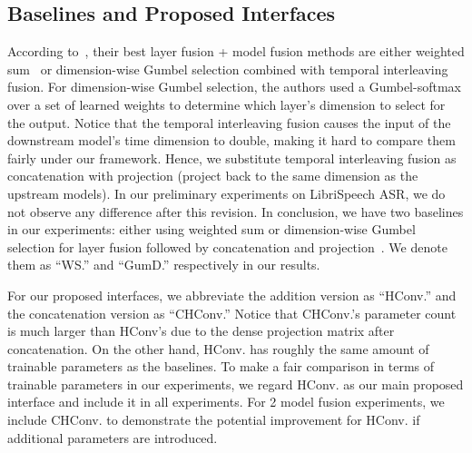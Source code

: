 \subsection{Baselines and Proposed Interfaces}
According to~\cite{chiu24_sinica}, their best layer fusion + model fusion methods are either weighted sum~\cite{yang21c_superb} or dimension-wise Gumbel selection combined with temporal interleaving fusion.
For dimension-wise Gumbel selection, the authors used a Gumbel-softmax over a set of learned weights to determine which layer's dimension to select for the output.
Notice that the temporal interleaving fusion causes the input of the downstream model's time dimension to double, making it hard to compare them fairly under our framework.
Hence, we substitute temporal interleaving fusion as concatenation with projection (project back to the same dimension as the upstream models).
In our preliminary experiments on LibriSpeech ASR, we do not observe any difference after this revision.
In conclusion, we have two baselines in our experiments: either using weighted sum or dimension-wise Gumbel selection for layer fusion followed by concatenation and projection~\cite{chiu24_sinica}.
We denote them as ``WS.'' and ``GumD.'' respectively in our results.

For our proposed interfaces, we abbreviate the addition version as ``HConv.'' and the concatenation version as ``CHConv.''
Notice that CHConv.'s parameter count is much larger than HConv's due to the dense projection matrix after concatenation.
On the other hand, HConv. has roughly the same amount of trainable parameters as the baselines.
To make a fair comparison in terms of trainable parameters in our experiments, we regard HConv. as our main proposed interface and include it in all experiments.
For 2 model fusion experiments, we include CHConv. to demonstrate the potential improvement for HConv. if additional parameters are introduced.






% 